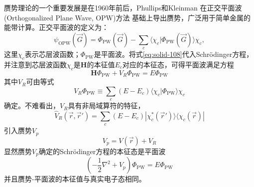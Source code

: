 {赝势理论的一个重要发展是在1960年前后，Phullips和Kleinman%
在正交平面波(Orthogonalized Plane Wave, OPW)方法%
基础上导出赝势，广泛用于简单金属的能带计算。正交平面波的定义为：
\begin{equation}
	\psi_{\mathrm{OPW}}(\vec G)=\Phi_{\mathrm{PW}}(\vec G)-\sum_c\langle\chi_c|\Phi_{\mathrm{PW}}(\vec G)\rangle\chi_c,
  \label{eq:solid-108}
\end{equation}
这里$\chi_c$表示芯层波函数；$\Phi_{\mathrm{PW}}$是平面波。将式\eqref{eq:solid-108}代入Schr\"odinger方程，%
并注意到芯层波函数$\chi_c$是$\mathbf H$的本征值$E_c$对应的本征态，可得平面波满足方程%
\begin{equation}
	\mathbf H\Phi_{\mathrm{PW}}+V_R\Phi_{\mathrm{PW}}=E\Phi_{\mathrm{PW}}
  \label{eq:solid-97}
\end{equation}
其中$V_R$可由等式
\begin{equation}
	V_R\Phi_{\mathrm{PW}}\equiv\sum\limits_c(E-E_c)\langle\chi_c|\Phi_{\mathrm{PW}}\rangle\chi_c
  \label{eq:solid-VR}
\end{equation}
确定。不难看出，$V_R$具有非局域算符的特征，%
\begin{equation}
	{\hat V}_R(\vec r,\vec r')=\sum_c(E-E_c)|\chi_c^{\ast}(\vec r')\rangle\langle\chi_c(\vec r)|
 \label{eq:solid-101}
\end{equation}
引入赝势$V_p$
\begin{equation}
  V_p=V(\vec r)+V_R
  \label{eq:solid-99}
\end{equation}
显然赝势$V_p$确定的Schr\"odinger方程的本征态是平面波
\begin{equation}
	(-\dfrac12\nabla^2+V_p)\Phi_{\mathrm{PW}}=E\Phi_{\mathrm{PW}}
  \label{eq:solid-98}
\end{equation}
并且赝势-平面波的本征值与真实电子态相同。%

}
